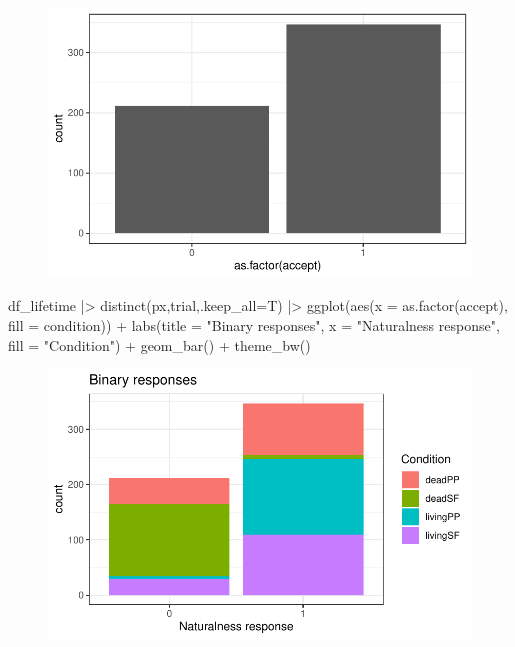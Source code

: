 \documentclass[
  letterpaper,
  DIV=11,
  numbers=noendperiod]{scrartcl}
\newenvironment{Shaded}{\begin{snugshade}}{\end{snugshade}}
\newcommand{\AttributeTok}[1]{\textcolor[rgb]{0.40,0.45,0.13}{#1}}
\newcommand{\FunctionTok}[1]{\textcolor[rgb]{0.28,0.35,0.67}{#1}}
\newcommand{\NormalTok}[1]{\textcolor[rgb]{0.00,0.23,0.31}{#1}}
\newcommand{\SpecialCharTok}[1]{\textcolor[rgb]{0.37,0.37,0.37}{#1}}
\newcommand{\StringTok}[1]{\textcolor[rgb]{0.13,0.47,0.30}{#1}}
\begin{document}
\begin{figure}[H]

{\centering \includegraphics{_data_viz_files/figure-pdf/unnamed-chunk-36-1.pdf}

}

\end{figure}

\begin{Shaded}
\begin{Highlighting}[]
\NormalTok{df\_lifetime }\SpecialCharTok{|\textgreater{}} 
  \FunctionTok{distinct}\NormalTok{(px,trial,}\AttributeTok{.keep\_all=}\NormalTok{T) }\SpecialCharTok{|\textgreater{}} 
  \FunctionTok{ggplot}\NormalTok{(}\FunctionTok{aes}\NormalTok{(}\AttributeTok{x =} \FunctionTok{as.factor}\NormalTok{(accept), }\AttributeTok{fill =}\NormalTok{ condition)) }\SpecialCharTok{+}
  \FunctionTok{labs}\NormalTok{(}\AttributeTok{title =} \StringTok{"Binary responses"}\NormalTok{,}
       \AttributeTok{x =} \StringTok{"Naturalness response"}\NormalTok{,}
       \AttributeTok{fill =} \StringTok{"Condition"}\NormalTok{) }\SpecialCharTok{+}
  \FunctionTok{geom\_bar}\NormalTok{() }\SpecialCharTok{+}
  \FunctionTok{theme\_bw}\NormalTok{()}
\end{Highlighting}
\end{Shaded}

\begin{figure}[H]

{\centering \includegraphics{_data_viz_files/figure-pdf/unnamed-chunk-37-1.pdf}

}

\end{figure}
\end{document}
